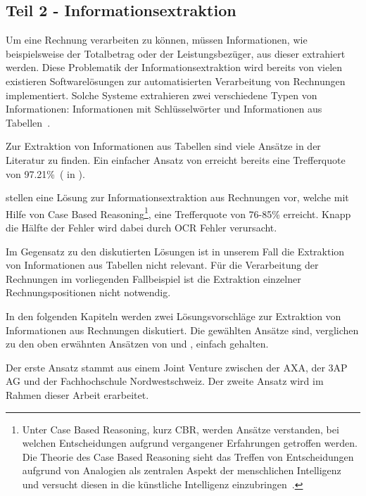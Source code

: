\subsection{Teil 2 - Informationsextraktion}
\label{chap:ie}



Um eine Rechnung verarbeiten zu können, müssen Informationen, wie beispielsweise der Totalbetrag oder der Leistungsbezüger, aus dieser extrahiert werden. Diese Problematik der Informationsextraktion wird bereits von vielen existieren Softwarelösungen zur automatisierten Verarbeitung von Rechnungen implementiert. Solche Systeme extrahieren zwei verschiedene Typen von Informationen: Informationen mit Schlüsselwörter und Informationen aus Tabellen~\autocite{Hamza}.

Zur Extraktion von Informationen aus Tabellen sind viele Ansätze in der Literatur zu finden. Ein einfacher Ansatz von \textcite{Mandal} erreicht bereits eine Trefferquote von 97.21\%~(\cite{Mandal} in \cite{Hamza}).

\textcite{Hamza} stellen eine Lösung zur Informationsextraktion aus Rechnungen vor, welche mit Hilfe von Case Based Reasoning\footnote{Unter Case Based Reasoning, kurz CBR, werden Ansätze verstanden, bei welchen Entscheidungen aufgrund vergangener Erfahrungen getroffen werden. Die Theorie des Case Based Reasoning sieht das Treffen von Entscheidungen aufgrund von Analogien als zentralen Aspekt der menschlichen Intelligenz und versucht diesen in die künstliche Intelligenz einzubringen~\autocite{CBR}.}, eine Trefferquote von 76-85\% erreicht. Knapp die Hälfte der Fehler wird dabei durch OCR Fehler verursacht.

Im Gegensatz zu den diskutierten Lösungen ist in unserem Fall die Extraktion von Informationen aus Tabellen nicht relevant. Für die Verarbeitung der Rechnungen im vorliegenden Fallbeispiel ist die Extraktion einzelner Rechnungspositionen nicht notwendig.

In den folgenden Kapiteln werden zwei Lösungsvorschläge zur Extraktion von Informationen aus Rechnungen diskutiert. Die gewählten Ansätze sind, verglichen zu den oben erwähnten Ansätzen von \textcite{Mandal} und \textcite{Hamza}, einfach gehalten. 

Der erste Ansatz stammt aus einem Joint Venture zwischen der AXA, der 3AP AG und der Fachhochschule Nordwestschweiz. Der zweite Ansatz wird im Rahmen dieser Arbeit erarbeitet.

